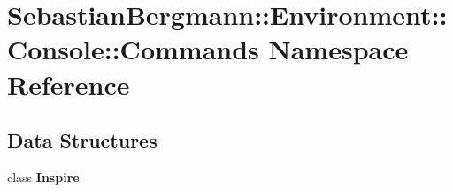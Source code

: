 \section{Sebastian\+Bergmann\+:\+:Environment\+:\+:Console\+:\+:Commands Namespace Reference}
\label{namespace_sebastian_bergmann_1_1_environment_1_1_console_1_1_commands}
\subsection*{Data Structures}
\begin{DoxyCompactItemize}
\item 
class {\bf Inspire}
\end{DoxyCompactItemize}
